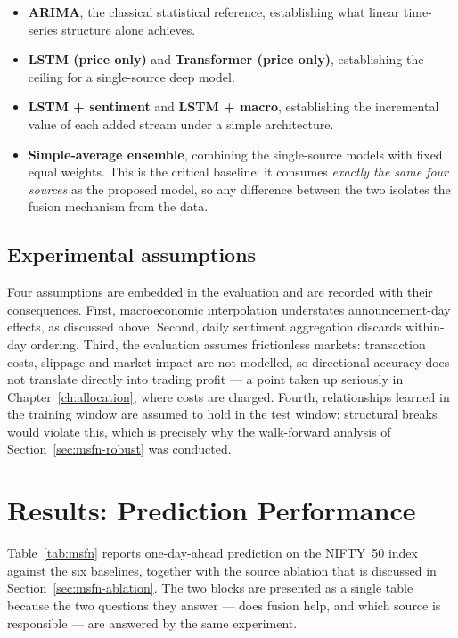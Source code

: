 \begin{itemize}
\item \textbf{ARIMA}, the classical statistical reference, establishing what linear time-series
structure alone achieves.
\item \textbf{LSTM (price only)} and \textbf{Transformer (price only)}, establishing the ceiling
for a single-source deep model.
\item \textbf{LSTM + sentiment} and \textbf{LSTM + macro}, establishing the incremental value of
each added stream under a simple architecture.
\item \textbf{Simple-average ensemble}, combining the single-source models with fixed equal
weights. This is the critical baseline: it consumes \emph{exactly the same four sources} as the
proposed model, so any difference between the two isolates the fusion mechanism from the data.
\end{itemize}

\subsection{Experimental assumptions}

Four assumptions are embedded in the evaluation and are recorded with their consequences.
First, macroeconomic interpolation understates announcement-day effects, as discussed above.
Second, daily sentiment aggregation discards within-day ordering. Third, the evaluation assumes
frictionless markets: transaction costs, slippage and market impact are not modelled, so
directional accuracy does not translate directly into trading profit --- a point taken up
seriously in Chapter~\ref{ch:allocation}, where costs are charged. Fourth, relationships learned
in the training window are assumed to hold in the test window; structural breaks would violate
this, which is precisely why the walk-forward analysis of Section~\ref{sec:msfn-robust} was
conducted.

\section{Results: Prediction Performance}
\label{sec:msfn-results}

Table~\ref{tab:msfn} reports one-day-ahead prediction on the NIFTY~50 index against the six
baselines, together with the source ablation that is discussed in
Section~\ref{sec:msfn-ablation}. The two blocks are presented as a single table because the two
questions they answer --- does fusion help, and which source is responsible --- are answered by
the same experiment.

